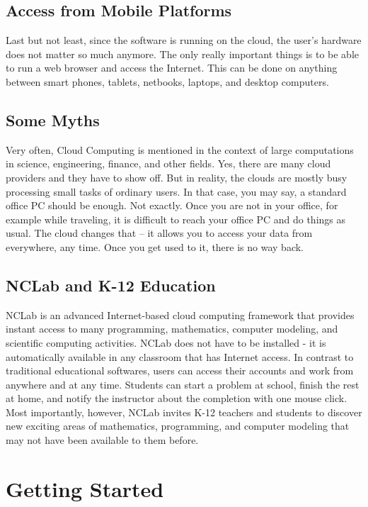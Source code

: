 \documentclass[article,A4,12pt]{llncs}
\begin{document}
\subsection{Access from Mobile Platforms}

Last but not least, since the software is running on the cloud, the user's hardware 
does not matter so much anymore. The only really important things is to be able to 
run a web browser and access the Internet. This can be done on anything between smart 
phones, tablets, netbooks, laptops, and desktop computers. 

\subsection{Some Myths}

Very often, Cloud Computing is mentioned in the context of large 
computations in science, engineering, finance, and other fields. Yes, there are many 
cloud providers and they have to show off. But in reality, the clouds are mostly
busy processing small tasks of ordinary users. In that case, you may say, a standard 
office PC should be enough. Not exactly. Once you are not in your office, for example
while traveling, it is difficult to reach your office PC and do things as usual. 
The cloud changes that -- it allows you to access your data 
from everywhere, any time. Once you get used to it, there is no way back. 

\subsection{NCLab and K-12 Education}

NCLab is an advanced Internet-based cloud computing framework that provides 
instant access to many programming, mathematics, computer
modeling, and scientific computing activities. NCLab does not have to be installed - it 
is automatically available in any classroom that has Internet access. In 
contrast to traditional educational softwares, 
users can access their accounts and work from anywhere and at any time.
Students can start a problem at school, finish the rest at home, and notify 
the instructor about the completion with one mouse click. Most importantly, 
however, NCLab invites K-12 teachers and students to discover new exciting 
areas of mathematics, programming, and computer modeling that may not have 
been available to them before.

\newpage


\section{Getting Started}
\end{document}
